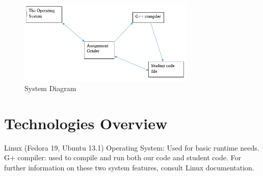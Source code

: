 \begin{figure}[tbh]
\begin{center}
\includegraphics[width=0.75\textwidth]{./diagram}
\end{center}
\caption{System Diagram \label{systemdiagram}}
\end{figure}

\section{Technologies Overview}
Linux (Fedora 19, Ubuntu 13.1) Operating System: Used for basic runtime needs. G+ compiler: used to compile and run both our code and student code. For further information on these two system features, consult Linux documentation.

